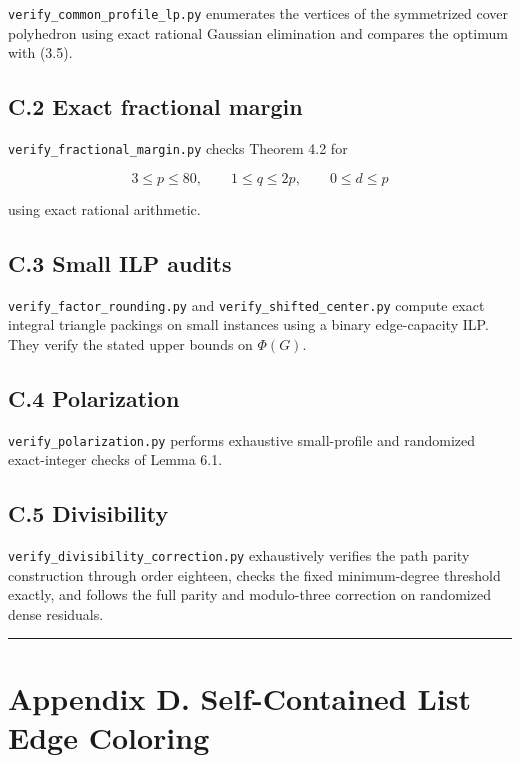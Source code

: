 \documentclass[
  11pt,
]{article}
\begin{document}
\texttt{verify\_common\_profile\_lp.py} enumerates the vertices of the symmetrized cover polyhedron using exact rational Gaussian elimination and compares the optimum with (3.5).

\subsection{C.2 Exact fractional margin}\label{c.2-exact-fractional-margin}

\texttt{verify\_fractional\_margin.py} checks Theorem 4.2 for

\[
3\le p\le80,
\qquad
1\le q\le2p,
\qquad
0\le d\le p
\]

using exact rational arithmetic.

\subsection{C.3 Small ILP audits}\label{c.3-small-ilp-audits}

\texttt{verify\_factor\_rounding.py} and \texttt{verify\_shifted\_center.py} compute exact integral triangle packings on small instances using a binary edge-capacity ILP. They verify the stated upper bounds on \(\Phi(G)\).

\subsection{C.4 Polarization}\label{c.4-polarization}

\texttt{verify\_polarization.py} performs exhaustive small-profile and randomized exact-integer checks of Lemma 6.1.

\subsection{C.5 Divisibility}\label{c.5-divisibility}

\texttt{verify\_divisibility\_correction.py} exhaustively verifies the path parity construction through order eighteen, checks the fixed minimum-degree threshold exactly, and follows the full parity and modulo-three correction on randomized dense residuals.

\begin{center}\rule{0.5\linewidth}{0.5pt}\end{center}

\section{Appendix D. Self-Contained List Edge Coloring}\label{appendix-d.-self-contained-list-edge-coloring}
\end{document}
